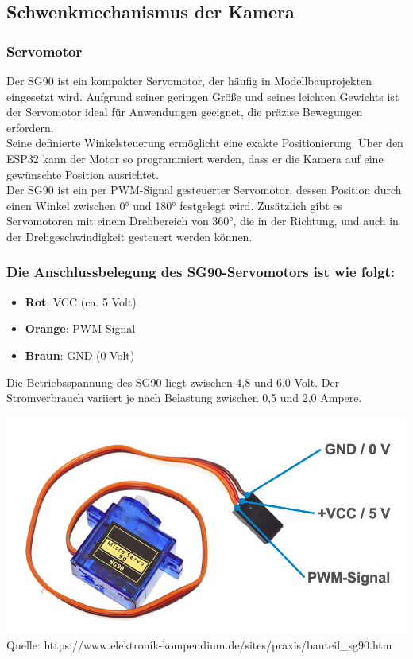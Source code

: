 \documentclass[ngerman,12pt,a4paper]{article}
\begin{document}
		\subsection{Schwenkmechanismus der Kamera}
				\subsubsection{Servomotor} %
				Der SG90 ist ein kompakter Servomotor, der häufig in Modellbauprojekten eingesetzt wird. Aufgrund seiner geringen Größe und seines leichten Gewichts ist der Servomotor ideal für Anwendungen geeignet, die präzise Bewegungen erfordern.\\
				Seine definierte Winkelsteuerung ermöglicht eine exakte Positionierung. Über den ESP32 kann der Motor so programmiert werden, dass er die Kamera auf eine gewünschte Position ausrichtet. \\
				Der SG90 ist ein per PWM-Signal gesteuerter Servomotor, dessen Position durch einen Winkel zwischen 0° und 180° festgelegt wird. Zusätzlich gibt es Servomotoren mit einem Drehbereich von 360°, die in der Richtung, und auch in der Drehgeschwindigkeit gesteuert werden können.
				\subsubsection*{Die Anschlussbelegung des SG90-Servomotors ist wie folgt:}
				\begin{itemize}
					\item \textbf{Rot}: VCC (ca. 5 Volt)
					\item \textbf{Orange}: PWM-Signal
					\item \textbf{Braun}: GND (0 Volt)
				\end{itemize}
				Die Betriebsspannung des SG90 liegt zwischen 4,8 und 6,0 Volt. Der Stromverbrauch variiert je nach Belastung zwischen 0,5 und 2,0 Ampere.  
				\begin{center}
					\begin{minipage}{0.9\textwidth}
						\centering
						\includegraphics[width=\textwidth]{Pictures/sg90}
						\label{fig:sg90}
						\vspace{5pt}
						{\small Quelle: {https://www.elektronik-kompendium.de/sites/praxis/bauteil\_sg90.htm}}
					\end{minipage}
				\end{center}
				\newpage \noindent
				
\end{document}
